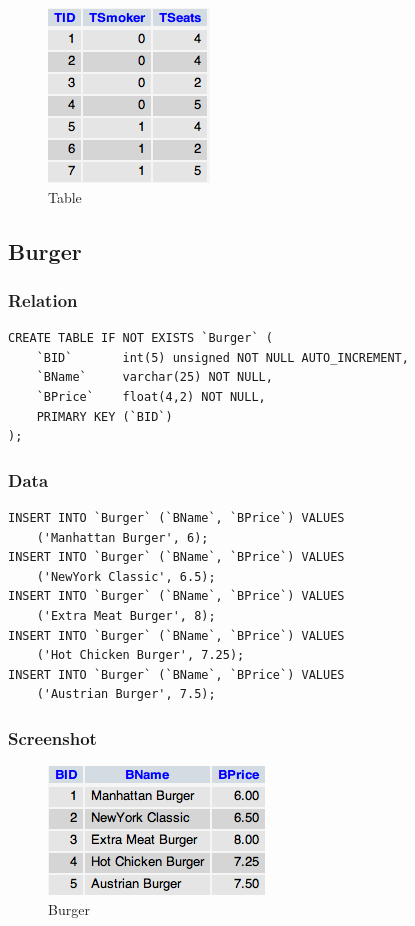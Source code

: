 \documentclass[10pt, a4paper]{article}
\begin{document}
\begin{figure}[htb]
	\centering
	\includegraphics[scale=0.9]{fig/table.png}
	\caption{Table}
\end{figure}

\subsection{Burger}

\subsubsection{Relation}

\begin{verbatim}
CREATE TABLE IF NOT EXISTS `Burger` (
  	`BID`    	int(5) unsigned NOT NULL AUTO_INCREMENT,
  	`BName`  	varchar(25) NOT NULL,
  	`BPrice` 	float(4,2) NOT NULL,
  	PRIMARY KEY (`BID`)
);
\end{verbatim}

\subsubsection{Data}

\begin{verbatim}
INSERT INTO `Burger` (`BName`, `BPrice`) VALUES
  	('Manhattan Burger', 6);
INSERT INTO `Burger` (`BName`, `BPrice`) VALUES
  	('NewYork Classic', 6.5);
INSERT INTO `Burger` (`BName`, `BPrice`) VALUES
  	('Extra Meat Burger', 8);
INSERT INTO `Burger` (`BName`, `BPrice`) VALUES
  	('Hot Chicken Burger', 7.25);
INSERT INTO `Burger` (`BName`, `BPrice`) VALUES
  	('Austrian Burger', 7.5);
\end{verbatim}

\subsubsection{Screenshot}

\begin{figure}[htb]
	\centering
	\includegraphics[scale=0.9]{fig/burger.png}
	\caption{Burger}
\end{figure}
\end{document}
